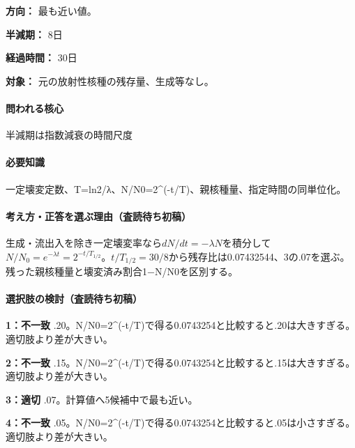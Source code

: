 \noindent\textbf{方向：} 最も近い値。\par

\noindent\textbf{半減期：} 8日\par

\noindent\textbf{経過時間：} 30日\par

\noindent\textbf{対象：} 元の放射性核種の残存量、生成等なし。\par

\paragraph{問われる核心} 半減期は指数減衰の時間尺度

\paragraph{必要知識} 一定壊変定数、T=\allowbreak{}ln2/λ、N/N0=\allowbreak{}2\textasciicircum{}(-t/T)、親核種量、指定時間の同単位化。

\paragraph{考え方・正答を選ぶ理由（査読待ち初稿）} 生成・流出入を除き一定壊変率なら\(dN/dt=-\lambda N\)を積分して\(N/N_0=e^{-\lambda t}=2^{-t/T_{1/2}}\)。\(t/T_{1/2}=30/8\)から残存比は0.07432544、3の.07を選ぶ。残った親核種量と壊変済み割合1−N/N0を区別する。

\paragraph{選択肢の検討（査読待ち初稿）}\mbox{}\par

\noindent\textbf{1：不一致} .20。N/N0=\allowbreak{}2\textasciicircum{}(-t/T)で得る0.0743254と比較すると.20は大きすぎる。 適切肢より差が大きい。\par

\noindent\textbf{2：不一致} .15。N/N0=\allowbreak{}2\textasciicircum{}(-t/T)で得る0.0743254と比較すると.15は大きすぎる。 適切肢より差が大きい。\par

\noindent\textbf{3：適切} .07。計算値へ5候補中で最も近い。\par

\noindent\textbf{4：不一致} .05。N/N0=\allowbreak{}2\textasciicircum{}(-t/T)で得る0.0743254と比較すると.05は小さすぎる。 適切肢より差が大きい。\par


